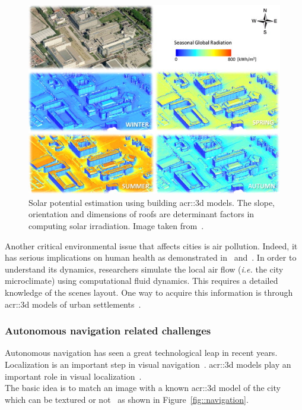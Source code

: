             \begin{figure}[htpb]
                \centering
                \includegraphics[width=.7\textwidth]{images/introduction/3d_model_applications/solar_potential}
                \caption[
                    Solar potential estimation using building \acrshort*{acr::3d} models.
                ]{
                    \label{fig::solar_potential}
                    Solar potential estimation using building \gls{acr::3d} models.
                    The slope, orientation and dimensions of roofs are determinant factors in computing solar irradiation.
                    Image taken from~\parencite{redweik2013solar}.
                }
            \end{figure}

            Another critical environmental issue that affects cities is air pollution.
            Indeed, it has serious implications on human health as demonstrated in~\textcite{pascal2013assessing} and~\textcite{chen2013evidence}.
            In order to understand its dynamics, researchers simulate the local air flow (\textit{i.e.} the city microclimate) using computational fluid dynamics.
            This requires a detailed knowledge of the scenes layout.
            One way to acquire this information is through \gls{acr::3d} models of urban settlements~\parencite{ujang2013unified}.
       
        \subsubsection{Autonomous navigation related challenges}
            Autonomous navigation has seen a great technological leap in recent years.
            Localization is an important step in visual navigation~\parencite{bonin2008visual}.
            \Gls{acr::3d} models play an important role in visual localization~\parencite{biljecki2015applications,piasco2018survey}.\\
            The basic idea is to match an image with a known \gls{acr::3d} model of the city which can be textured or not~\parencite{cham2010estimating,ardeshir2014gis,arth2015instant,christie2016semantics} as shown in Figure~\ref{fig::navigation}.


